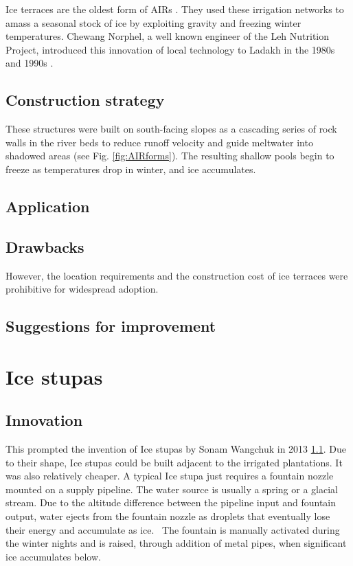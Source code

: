 Ice terraces are the oldest form of AIRs \citep{norphelArtificialGlacierHigh2009}. They used these irrigation
networks to amass a seasonal stock of ice by exploiting gravity and freezing winter temperatures. Chewang
Norphel, a well known engineer of the Leh Nutrition Project, introduced this innovation of local technology to
Ladakh in the 1980s and 1990s \citep{vinceGlacierMan2009}.

\subsection{Construction strategy}

These structures were built on south-facing slopes as a cascading series of rock walls in the river beds to
reduce runoff velocity and guide meltwater into shadowed areas (see Fig. \ref{fig:AIRforms}). The resulting
shallow pools begin to freeze as temperatures drop in winter, and ice accumulates. 

\subsection{Application}

\subsection{Drawbacks}

However, the location requirements and the construction cost of ice terraces were prohibitive for widespread
adoption. 

\subsection{Suggestions for improvement}

\section{Ice stupas}

\subsection{Innovation}

This prompted the invention of Ice stupas by Sonam Wangchuk in 2013 \ref{}. Due to their shape, Ice
stupas could be built adjacent to the irrigated plantations. It was also relatively cheaper. A typical Ice stupa
just requires a fountain nozzle mounted on a supply pipeline. The water source is usually a spring or a glacial
stream. Due to the altitude difference between the pipeline input and fountain output, water ejects from the
fountain nozzle as droplets that eventually lose their energy and accumulate as ice.  The fountain is manually
activated during the winter nights and is raised, through addition of metal pipes, when significant ice
accumulates below.

